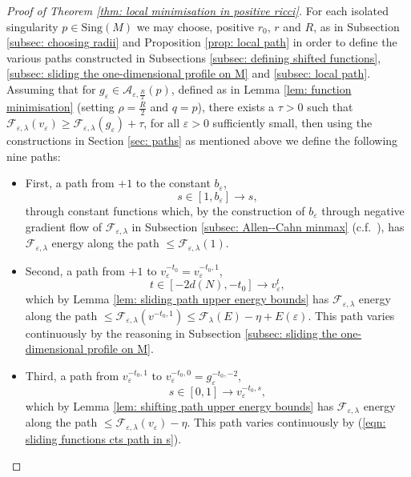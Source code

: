 \documentclass[11pt]{article}
\begin{document}
\begin{proof}[Proof of Theorem \ref{thm: local minimisation in positive ricci}]
For each isolated singularity $p \in \mathrm{Sing}(M)$ we may choose, positive $r_0$, $r$ and $R$, as in Subsection \ref{subsec: choosing radii} and Proposition \ref{prop: local path} in order to define the various paths constructed in Subsections \ref{subsec: defining shifted functions}, \ref{subsec: sliding the one-dimensional profile on M} and \ref{subsec: local path}. Assuming that for $g_\varepsilon \in \mathcal{A}_{\varepsilon,\frac{R}{2}}(p)$, defined as in Lemma \ref{lem: function minimisation} (setting $\rho = \frac{R}{2}$ and $q = p$), there exists a $\tau > 0$ such that $\mathcal{F}_{\varepsilon,\lambda}(v_\varepsilon) \geq \mathcal{F}_{\varepsilon,\lambda}(g_\varepsilon) + \tau$, for all $\varepsilon > 0$ sufficiently small, then using the constructions in Section \ref{sec: paths} as mentioned above we define the following nine paths:

\begin{itemize}
    \item First, a path from $+1$ to the constant $b_\varepsilon$,
    \begin{equation*}
        s \in [1,b_\varepsilon] \rightarrow s,
    \end{equation*}
    through constant functions which, by the construction of $b_\varepsilon$ through negative gradient flow of $\mathcal{F}_{\varepsilon,\lambda}$ in Subsection \ref{subsec: Allen--Cahn minmax} (c.f.~\cite[Section 5]{bellettini-wickramasekera}), has $\mathcal{F}_{\varepsilon,\lambda}$ energy along the path $\leq \mathcal{F}_{\varepsilon,\lambda}(1)$.
    
    \item Second, a path from $+1$ to $v^{-t_0}_\varepsilon = v^{-t_0,1}_\varepsilon$,
    \begin{equation*}
    t \in [-2d(N), -t_0] \rightarrow v^{t}_\varepsilon,
    \end{equation*}
    which by Lemma \ref{lem: sliding path upper energy bounds} has $\mathcal{F}_{\varepsilon,\lambda}$ energy along the path $\leq \mathcal{F}_{\varepsilon,\lambda}(v^{-t_0,1}) \leq \mathcal{F}_\lambda(E) - \eta + E(\varepsilon)$. This path varies continuously by the reasoning in Subsection \ref{subsec: sliding the one-dimensional profile on M}.


    \item Third, a path from $v^{-t_0,1}_\varepsilon$ to $v^{-t_0,0}_\varepsilon = g^{-t_0,-2}_\varepsilon$,
    \begin{equation*}
    s \in [0, 1] \rightarrow v^{-t_0,s}_\varepsilon,
    \end{equation*}
    which by Lemma \ref{lem: shifting path upper energy bounds} has $\mathcal{F}_{\varepsilon,\lambda}$ energy along the path $\leq \mathcal{F}_{\varepsilon,\lambda}(v_\varepsilon) -  \eta$. This path varies continuously by (\ref{eqn: sliding functions cts path in s}).



\end{itemize}
\end{proof}
\end{document}

